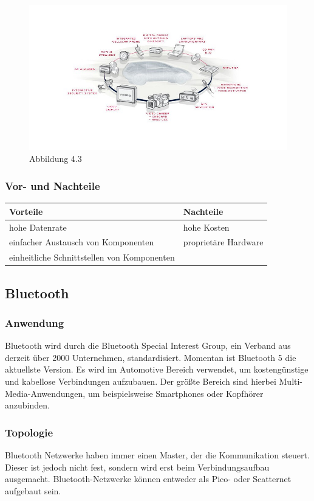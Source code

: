 \begin{figure}[h!]
	\includegraphics[width=\linewidth]{most_ring.jpg}
	\caption{Abbildung 4.3 \cite{.MH_Ring}}
\end{figure}

\subsubsection{Vor- und Nachteile}
\begin{tabular}{l|l}
	\textbf{Vorteile} & \textbf{Nachteile}\\
	\hline hohe Datenrate & hohe Kosten\\
	\hline einfacher Austausch von Komponenten & proprietäre Hardware\\
	\hline einheitliche Schnittstellen von Komponenten &\\
\end{tabular}

\subsection{Bluetooth}		
\subsubsection{Anwendung}
Bluetooth wird durch die Bluetooth Special Interest Group, ein Verband aus derzeit über 2000 Unternehmen,  standardisiert. Momentan ist Bluetooth 5 die aktuellste Version. Es wird im Automotive Bereich verwendet, um kostengünstige und kabellose Verbindungen aufzubauen. Der größte Bereich sind hierbei Multi-Media-Anwendungen, um beispielsweise Smartphones oder Kopfhörer anzubinden. \cite{BP01}

\subsubsection{Topologie}
Bluetooth Netzwerke haben immer einen Master, der die Kommunikation steuert. Dieser ist jedoch nicht fest, sondern wird erst beim Verbindungsaufbau ausgemacht.
Bluetooth-Netzwerke können entweder als Pico- oder Scatternet aufgebaut sein.
                                                                                  
